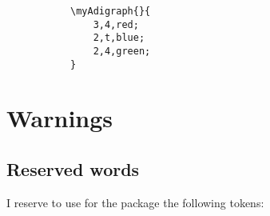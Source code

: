 \documentclass{report}
\begin{document}
\begin{figure}
	\begin{subfigure}{0.49\textwidth}
		\begin{verbatim}
\myAdigraph{}{
	3,4,red;
	2,t,blue;
	2,4,green;
}
\end{verbatim}
	\end{subfigure}
	\begin{subfigure}{0.49\textwidth}
	\end{subfigure}
\end{figure}

\chapter{Warnings}
\section{Reserved words}
I reserve to use for the package the following tokens:
\end{document}
